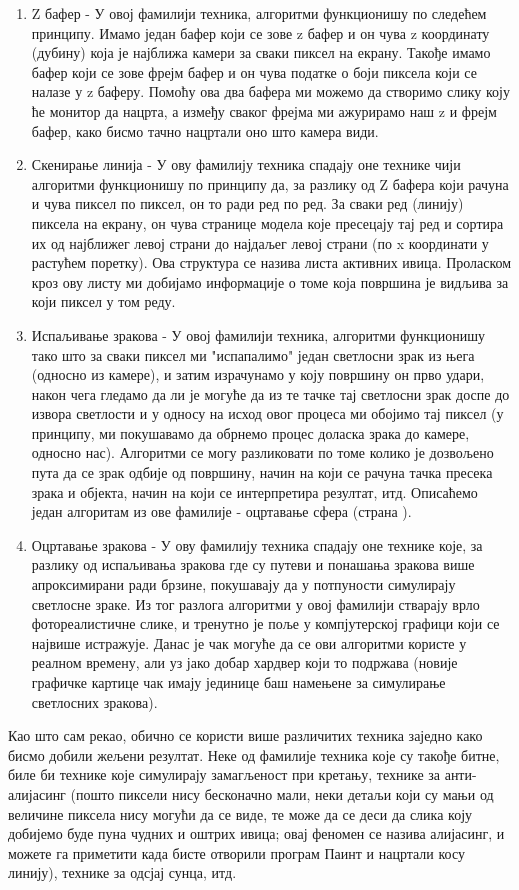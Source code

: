 \documentclass[12pt]{article}
\begin{document}
	\begin{enumerate}
	\item Z бафер - У овој фамилији техника, алгоритми функционишу по следећем принципу. Имамо један бафер који се зове z бафер и он чува z координату (дубину) која је најближа камери за сваки пиксел на екрану. Такође имамо бафер који се зове фрејм бафер и он чува податке о боји пиксела који се налазе у z баферу. Помоћу ова два бафера ми можемо да створимо слику коју ће монитор да нацрта, а између сваког фрејма ми ажурирамо наш z и фрејм бафер, како бисмо тачно нацртали оно што камера види.
	\item Скенирање линија - У ову фамилију техника спадају оне технике чији алгоритми функционишу по принципу да, за разлику од Z бафера који рачуна и чува пиксел по пиксел, он то ради ред по ред. За сваки ред (линију) пиксела на екрану, он чува странице модела које пресецају тај ред и сортира их од најближег левој страни до најдаљег левој страни (по x координати у растућем поретку). Ова структура се назива листа активних ивица. Проласком кроз ову листу ми добијамо информације о томе која површина је видљива за који пиксел у том реду.
	\item Испаљивање зракова - У овој фамилији техника, алгоритми функционишу тако што за сваки пиксел ми "испапалимо" један светлосни зрак из њега (односно из камере), и затим израчунамо у коју површину он прво удари, након чега гледамо да ли је могуће да из те тачке тај светлосни зрак доспе до извора светлости и у односу на исход овог процеса ми обојимо тај пиксел (у принципу, ми покушавамо да обрнемо процес доласка зрака до камере, односно нас). Алгоритми се могу разликовати по томе колико је дозвољено пута да се зрак одбије од површину, начин на који се рачуна тачка пресека зрака и објекта, начин на који се интерпретира резултат, итд. Описаћемо један алгоритам из ове фамилије - оцртавање сфера (страна \pageref{sfericnorenderovanje}).
	\item Оцртавање зракова - У ову фамилију техника спадају оне технике које, за разлику од испаљивања зракова где су путеви и понашања зракова више апроксимирани ради брзине, покушавају да у потпуности симулирају светлосне зраке. Из тог разлога алгоритми у овој фамилији стварају врло фотореалистичне слике, и тренутно је поље у компјутерској графици који се највише истражује. Данас је чак могуће да се ови алгоритми користе у реалном времену, али уз јако добар хардвер који то подржава (новије графичке картице чак имају јединице баш намењене за симулирање светлосних зракова).
	\end{enumerate}
	Као што сам рекао, обично се користи више различитих техника заједно како бисмо добили жељени резултат. Неке од фамилије техника које су такође битне, биле би технике које симулирају замагљеност при кретању, технике за анти-алијасинг (пошто пиксели нису бесконачно мали, неки детаљи који су мањи од величине пиксела нису могући да се виде, те може да се деси да слика коју добијемо буде пуна чудних и оштрих ивица; овај феномен се назива алијасинг, и можете га приметити када бисте отворили програм Паинт и нацртали косу линију), технике за одсјај сунца, итд.
	
\end{document}

